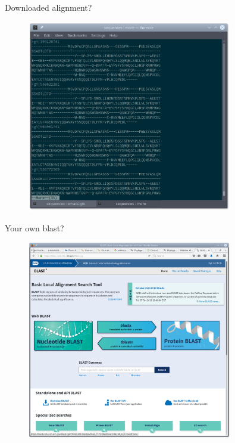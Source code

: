 \documentclass[pdf]{beamer}
\begin{document}
\begin{frame}{Downloaded alignment?}
  \begin{figure}[ht]
    \includegraphics[width=0.8\textwidth]{images/ncbi_blink_8}
  \end{figure}
  
\end{frame}

\begin{frame}{Your own blast?}
  \begin{figure}[ht]
    \includegraphics[width=0.8\textwidth]{images/ncbi_blast_1}
  \end{figure} 
\end{frame}
\end{document}
